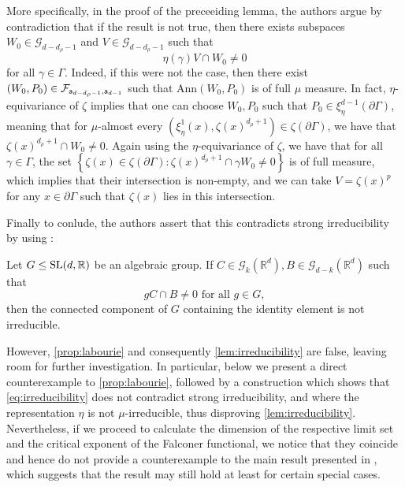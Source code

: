 \documentclass{report}
\begin{document}
More specifically, in the proof of the preceeiding lemma, the authors argue by contradiction that if the result is not true, then there exists subspaces $W_0 \in \mathcal G_{d-d_\rho - 1}$ and $V \in \mathcal G_{d-d_\rho - 1}$ such that
\[
\eta(\gamma) V \cap W_0 \neq 0
\]
for all $\gamma \in \Gamma$.
Indeed, if this were not the case, then there exist $(W_0, P_0) \in \mathcal F_{{\sf a}_{d-d_\rho - 1}, {\sf a}_{d-1}}$ such that $\mathrm{Ann}(W_0,P_0)$ is of full $\mu$ measure.
In fact, $\eta$-equivariance of $\zeta$ implies that one can choose $W_0, P_0$ such that $P_0 \in \xi^{d-1}_\eta(\partial \Gamma)$, meaning that for $\mu$-almost every $(\xi^1_\eta(x), \zeta(x)^{d_\rho + 1}) \in \zeta(\partial \Gamma)$, we have that $\zeta(x)^{d_\rho + 1} \cap W_0 \neq 0$.
Again using the $\eta$-equivariance of $\zeta$, we have that for all $\gamma \in \Gamma$, the set 
$\left\{ \zeta(x) \in \zeta(\partial \Gamma) : \zeta(x)^{d_\rho + 1} \cap \gamma W_0 \neq 0 \right\}$
is of full measure, which implies that their intersection is non-empty, and we can take $V = \zeta(x)^p$ for any $x \in \partial \Gamma$ such that $\zeta(x)$ lies in this intersection.

Finally to conlude, the authors assert that this contradicts strong irreducibility by using \cite[Proposition 10.3]{labourie_anosov_2006}:
\begin{proposition}[Labourie]\label{prop:labourie}
Let $G \leq \operatorname{{\mathrm{SL}}}(d, \mathbb R)$ be an algebraic group.
If $C \in \mathcal G_{k}(\mathbb R^d), B \in \mathcal G_{d-k}(\mathbb R^d)$ such that
\begin{equation}\label{eq:irreducibility}
    g C \cap B \neq 0 \text{ for all } g \in G,
\end{equation}
then the connected component of $G$ containing the identity element is not irreducible.
\end{proposition}

However, \cref{prop:labourie} and consequently \cref{lem:irreducibility} are false, leaving room for further investigation.
In particular, below we present a direct counterexample to \cref{prop:labourie}, followed by a construction which shows that \cref{eq:irreducibility} does not contradict strong irreducibility, and where the representation $\eta$ is not $\mu$-irreducible, thus disproving \cref{lem:irreducibility}.
Nevertheless, if we proceed to calculate the dimension of the respective limit set and the critical exponent of the Falconer functional, we notice that they coincide and hence do not provide a counterexample to the main result presented in \cite{pozzetti_anosov_2023}, which suggests that the result may still hold at least for certain special cases.
\end{document}
